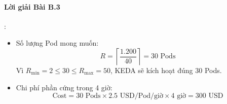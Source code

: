 \paragraph{Lời giải Bài B.3}:
\begin{itemize}
  \item Số lượng Pod mong muốn:
  \begin{equation*}
  R = \left\lceil \frac{1.200}{40} \right\rceil = 30\text{ Pods}
  \end{equation*}
  Vì $R_{\min} = 2 \le 30 \le R_{\max} = 50$, KEDA sẽ kích hoạt đúng $30$ Pods.
  \item Chi phí phần cứng trong 4 giờ:
  \begin{equation*}
  \text{Cost} = 30\text{ Pods} \times 2.5\text{ USD/Pod/giờ} \times 4\text{ giờ} = 300\text{ USD}
  \end{equation*}
\end{itemize}

